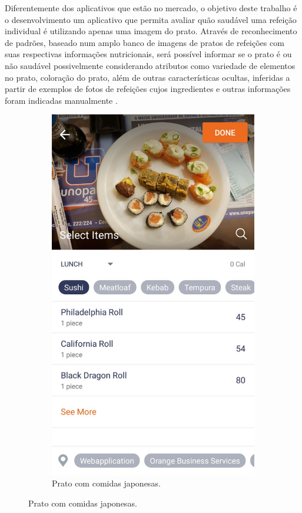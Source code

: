 Diferentemente dos aplicativos que estão no mercado, o objetivo deste trabalho é o desenvolvimento um aplicativo que permita avaliar quão saudável uma refeição individual é utilizando apenas uma imagem do prato. Através de reconhecimento de padrões, baseado num amplo banco de imagens de pratos de refeições com suas respectivas informações nutricionais, será possível informar se o prato é ou não saudável possivelmente considerando atributos como variedade de elementos no prato, coloração do prato, além de outras características ocultas, inferidas a partir de exemplos de fotos de refeições cujos ingredientes e outras informações foram indicadas manualmente \cite{nasrabadi2007pattern}.


\begin{figure}[!ht]
\centering
\caption{Comparação entre diferentes pratos.}
\begin{subfigure}{0.4\textwidth}
  \centering
    \caption{Prato com comidas japonesas.}
   \includegraphics[width=\textwidth]{imgs/sushi.jpeg}

\end{subfigure}
\end{figure}
